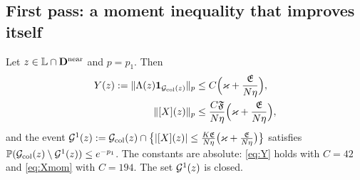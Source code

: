 \subsection{First pass: a moment inequality that improves itself}
\begin{proposition}\label{prop:S1}
Let $z\in\mathbb L\cap\mathbf{D}^{\rm near}$ and $p=p_1$. Then
\begin{align}
 Y(z):=\|\Lambda(z)\mathbf{1}_{\mathcal{G}_{\rm col}(z)}\|_{p}&\le C\Big(\varkappa+\frac{\mathfrak E}{N\eta}\Big),\label{eq:Y}\\
 \|[X](z)\|_{p}&\le\frac{C\mathfrak F}{N\eta}\Big(\varkappa+\frac{\mathfrak E}{N\eta}\Big),\label{eq:Xmom}
\end{align}
and the event $\mathcal{G}^1(z):=\mathcal{G}_{\rm col}(z)\cap\big\{|[X](z)|\le\frac{K\mathfrak E}{N\eta}\big(\varkappa+\frac{\mathfrak E}{N\eta}\big)\big\}$ satisfies $\mathbb{P}(\mathcal{G}_{\rm col}(z)\setminus\mathcal{G}^1(z))\le e^{-p_1}$.
The constants are absolute: \eqref{eq:Y} holds with $C=42$ and \eqref{eq:Xmom} with $C=194$. The set $\mathcal{G}^1(z)$ is closed.
\end{proposition}
